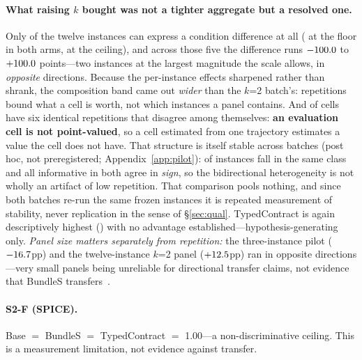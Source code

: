 \documentclass{article}
\begin{document}
\paragraph{What raising $k$ bought was not a tighter aggregate but a resolved one.} Only \StatEightAInformativeN{} of the twelve instances can express a condition difference at all (\StatEightAFloorN{} at the floor in both arms, \StatEightACeilingN{} at the ceiling), and across those five the difference runs $-100.0$ to $+100.0$ points---two instances at the largest magnitude the scale allows, in \emph{opposite} directions. Because the per-instance effects sharpened rather than shrank, the composition band came out \emph{wider} than the $k$=2 batch's: repetitions bound what a cell is worth, not which instances a panel contains. And \StatEightAUnstableCells{} of \StatEightACells{} cells have six identical repetitions that disagree among themselves: \textbf{an evaluation cell is not point-valued}, so a cell estimated from one trajectory estimates a value the cell does not have. That structure is itself stable across batches (post hoc, not preregistered; Appendix~\ref{app:pilot}): \StatConcordSame{} of \StatConcordTotal{} instances fall in the same class and all \StatConcordSignOf{} informative in both agree in \emph{sign}, so the bidirectional heterogeneity is not wholly an artifact of low repetition. That comparison pools nothing, and since both batches re-run the same frozen instances it is repeated measurement of stability, never replication in the sense of \S\ref{sec:qual}. TypedContract is again descriptively highest (\StatEightATC{}) with no advantage established---hypothesis-generating only. \emph{Panel size matters separately from repetition:} the three-instance pilot ($-16.7$pp) and the twelve-instance $k$=2 panel ($+12.5$pp) ran in opposite directions---very small panels being unreliable for directional transfer claims, not evidence that BundleS transfers~\citep{safetycap}.

\paragraph{S2-F (SPICE).} Base $=$ BundleS $=$ TypedContract $=$ 1.00---a non-discriminative ceiling. This is a measurement limitation, not evidence against transfer.
\end{document}
